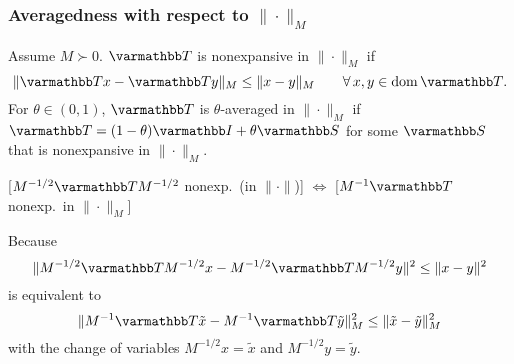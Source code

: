 \documentclass[10pt,mathserif]{beamer}
\begin{document}
\begin{frame}
\frametitle{Averagedness with respect to $\|\cdot\|_M$}
Assume $M\succ 0$.
$\opT$ is nonexpansive in $\|\cdot\|_M$ if
\[
\|\opT x-\opT y\|_M\le \|x-y\|_M\qquad\forall\,x,y\in \dom \opT.
\]
For $\theta\in(0,1)$, $\opT $ is $\theta$-averaged in $\|\cdot\|_M$
if $\opT =(1-\theta)\opI+\theta \opS $ for some $\opS $ that is nonexpansive in $\|\cdot\|_M$.

\vspace{0.2in}


[$M^{-1/2}\opT M^{-1/2}$  nonexp.\ (in $\|\cdot\|$)]
$\Leftrightarrow$
[$M^{-1}\opT$ nonexp.\ in $\|\cdot\|_M$]

Because
\[
\|M^{-1/2}\opT M^{-1/2}x-M^{-1/2}\opT M^{-1/2}y\|^2\le \|x-y\|^2
\]
is equivalent to
\[
\|M^{-1}\opT \tilde{x}-M^{-1}\opT \tilde{y}\|^2_M\le \|\tilde{x}-\tilde{y}\|^2_M
\]
with the change of variables
$M^{-1/2}x=\tilde{x}$ and $M^{-1/2}y=\tilde{y}$.
\end{frame}









\iffalse
\fi
\end{document}

